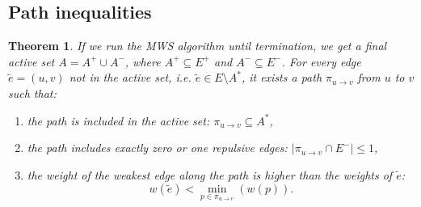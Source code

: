 \documentclass[12pt]{article}
\newtheorem{theorem}{Theorem}[section]
\begin{document}
\subsection{Path inequalities}
\begin{theorem}
If we run the MWS algorithm until termination, we get a final active set ${A = A^{+} \cup A^{-}}$, where $A^{+} \subseteq E^+$ and $A^{-} \subseteq E^-$. For every edge $\tilde{e}=(u,v)$ not in the active set, i.e. $\tilde{e} \in E\setminus A^*$, it exists a path $\pi_{u \rightarrow v}$ from $u$ to $v$ such that:
\begin{enumerate}
\item the path is included in the active set: $\pi_{u \rightarrow v} \subseteq A^*$,  \label{cond_1} 
\item the path includes exactly zero or one repulsive edges: $\left| \pi_{u \rightarrow v} \cap E^{-}  \right| \leq 1$, \label{cond_2}
\item the weight of the weakest edge along the path is higher than the weights of $\tilde{e}$: \label{cond_3}
\[ 
w(\tilde{e}) < \min_{p\in \pi_{u \rightarrow v}}  (w(p)).
\]
\end{enumerate} 
\end{theorem}
\end{document}
